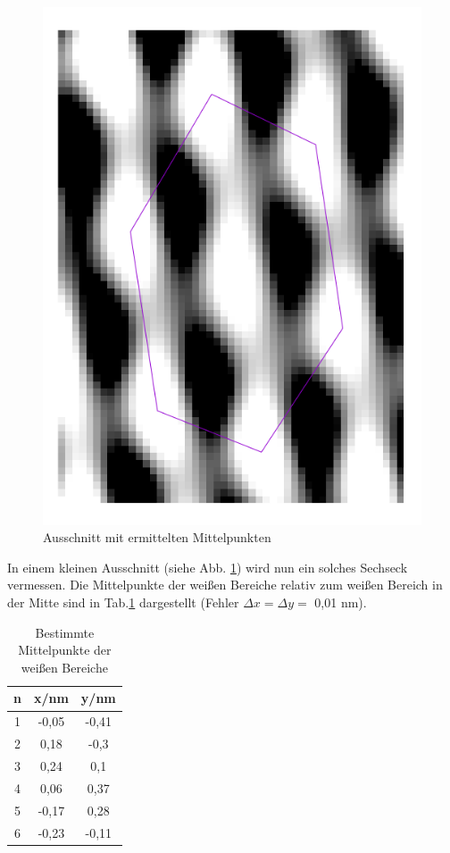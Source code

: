 \begin{figure}
\centering
\includegraphics[angle=90,scale=0.35]{data/graphit/graphit.png}
\caption{Ausschnitt mit ermittelten Mittelpunkten}
\label{fig:small}
\end{figure}

In einem kleinen Ausschnitt (siehe Abb. \ref{fig:small}) wird nun ein solches Sechseck vermessen. Die Mittelpunkte der weißen Bereiche relativ zum weißen Bereich in der Mitte sind in Tab.\ref{tab:points} dargestellt (Fehler $\Delta x=\Delta y=$ 0,01 nm).

\newpage

\begin{table}
\centering
\begin{tabular}{ccc}
\toprule
n & x/nm & y/nm\\
\midrule
1 & -0,05 &-0,41\\
2 & 0,18&	-0,3\\
3 & 0,24&	0,1\\
4 & 0,06&	0,37\\
5 & -0,17&	0,28\\
6 & -0,23&	-0,11\\
\bottomrule
\end{tabular}
\caption{Bestimmte Mittelpunkte der weißen Bereiche}
\label{tab:points}
\end{table}
 
